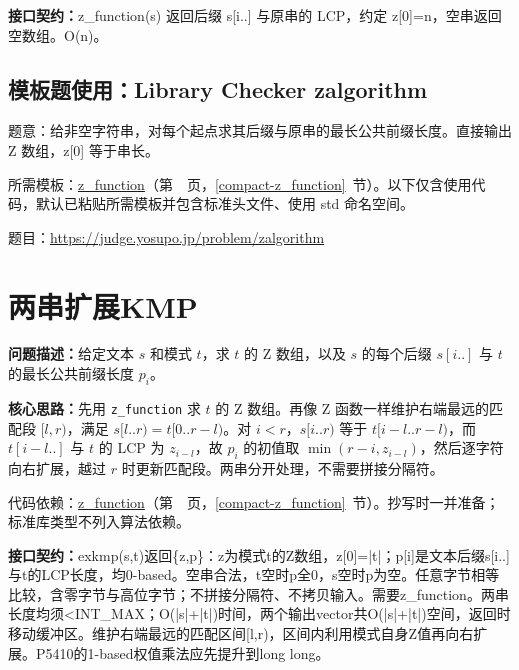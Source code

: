{\sloppy{}\noindent\textbf{接口契约：}z\_function(s) 返回后缀 s[i..] 与原串的 LCP，约定 z[0]=n，空串返回空数组。O(n)。\par}



\Needspace{266pt}

\subsection*{模板题使用：Library Checker zalgorithm}

\label{usage-example-22}

题意：给非空字符串，对每个起点求其后缀与原串的最长公共前缀长度。直接输出 Z 数组，z[0] 等于串长。

所需模板：\hyperref[compact-z_function]{z\_\allowbreak{}function}（第~\pageref{compact-z_function}~页，\ref{compact-z_function}~节）。以下仅含使用代码，默认已粘贴所需模板并包含标准头文件、使用 std 命名空间。

题目：\url{https://judge.yosupo.jp/problem/zalgorithm}



\Needspace{407pt}

\section{两串扩展KMP}\label{compact-exkmp}

\noindent\textbf{问题描述：}\allowbreak 给定文本 $s$ 和模式 $t$，求 $t$ 的 Z 数组，以及 $s$ 的每个后缀 $s[i..]$ 与 $t$ 的最长公共前缀长度 $p_i$。

\textbf{核心思路：}\allowbreak 先用 \texttt{z\_function} 求 $t$ 的 Z 数组。再像 Z 函数一样维护右端最远的匹配段 $[l,r)$，满足 $s[l..r)=t[0..r-l)$。对 $i<r$，$s[i..r)$ 等于 $t[i-l..r-l)$，而 $t[i-l..]$ 与 $t$ 的 LCP 为 $z_{i-l}$，故 $p_i$ 的初值取 $\min(r-i,z_{i-l})$，然后逐字符向右扩展，越过 $r$ 时更新匹配段。两串分开处理，不需要拼接分隔符。

代码依赖：\hyperref[compact-z_function]{z\_\allowbreak{}function}（第~\pageref{compact-z_function}~页，\ref{compact-z_function}~节）。抄写时一并准备；标准库类型不列入算法依赖。

{\sloppy{}\noindent\textbf{接口契约：}exkmp(s,t)返回\{z,p\}：z为模式t的Z数组，z[0]=|t|；p[i]是文本后缀s[i..]与t的LCP长度，均0-based。空串合法，t空时p全0，s空时p为空。任意字节相等比较，含零字节与高位字节；不拼接分隔符、不拷贝输入。需要z\_function。两串长度均须<INT\_MAX；O(|s|+|t|)时间，两个输出vector共O(|s|+|t|)空间，返回时移动缓冲区。维护右端最远的匹配区间[l,r)，区间内利用模式自身Z值再向右扩展。P5410的1-based权值乘法应先提升到long long。\par}

